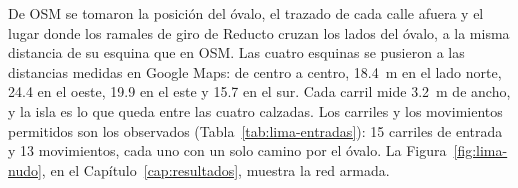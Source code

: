 De OSM se tomaron la posición del óvalo, el trazado de cada calle
afuera y el lugar donde los ramales de giro de Reducto cruzan los lados
del óvalo, a la misma distancia de su esquina que en OSM. Las cuatro
esquinas se pusieron a las distancias medidas en Google Maps: de centro
a centro, 18.4~m en el lado norte, 24.4 en el oeste, 19.9 en el este y
15.7 en el sur. Cada carril mide 3.2~m de ancho, y la isla es lo que
queda entre las cuatro calzadas. Los carriles y los movimientos
permitidos son los observados (Tabla~\ref{tab:lima-entradas}): 15
carriles de entrada y 13 movimientos, cada uno con un solo camino por el
óvalo. La Figura~\ref{fig:lima-nudo}, en el Capítulo~\ref{cap:resultados},
muestra la red armada.

